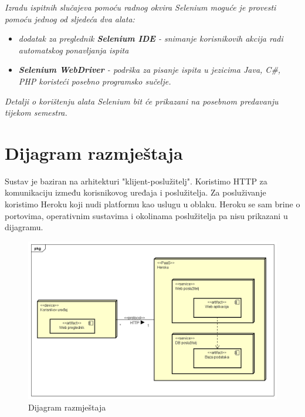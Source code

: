 {			 \textit{Izradu ispitnih slučajeva pomoću radnog okvira Selenium moguće je provesti pomoću jednog od sljedeća dva alata:}
			 \begin{itemize}
			 	\item \textit{dodatak za preglednik \textbf{Selenium IDE} - snimanje korisnikovih akcija radi automatskog ponavljanja ispita	}
			 	\item \textit{\textbf{Selenium WebDriver} - podrška za pisanje ispita u jezicima Java, C\#, PHP koristeći posebno programsko sučelje.}
			 \end{itemize}
		 	\textit{Detalji o korištenju alata Selenium bit će prikazani na posebnom predavanju tijekom semestra.}
			
			\eject 
		
		
		\section{Dijagram razmještaja}
			
			Sustav je baziran na arhitekturi "klijent-poslužitelj". Koristimo HTTP za komunikaciju između korisnikovog uređaja i poslužitelja. Za posluživanje koristimo Heroku koji nudi platformu kao uslugu u oblaku. Heroku se sam brine o portovima, operativnim sustavima i okolinama poslužitelja pa nisu prikazani u dijagramu.
			
			\begin{figure}[!h]
				\centering
				\includegraphics[width=1\linewidth]{slike/Dijagram_razmjestaja}
				\caption{Dijagram razmještaja}
				\label{fig:dijagramrazmjestaja}
			\end{figure}
			\eject
			
			\eject 
		
}
